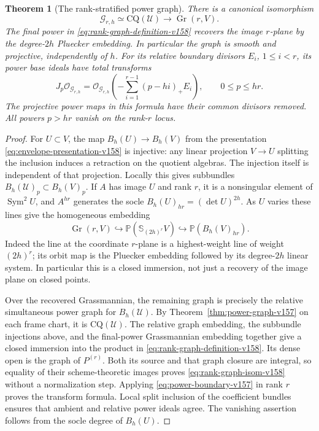 \documentclass[11pt,reqno]{amsart}
\numberwithin{equation}{section}
\newtheorem{theorem}{Theorem}[section]
\theoremstyle{definition}\newtheorem{definition}[theorem]{Definition}
\theoremstyle{remark}\newtheorem{remark}[theorem]{Remark}
\newcommand{\Pj}{\mathbb P}\newcommand{\A}{\mathbb A}
\newcommand{\OO}{\mathcal O}\newcommand{\II}{\mathcal I}
\DeclareMathOperator{\Sym}{Sym}\DeclareMathOperator{\Gr}{Gr}
\begin{document}
\begin{theorem}[The rank-stratified power graph]
\label{thm:all-rank-graph-v158}
There is a canonical isomorphism
\begin{equation}\label{eq:rank-graph-isom-v158}
 \mathcal G_{r,h}\simeq\mathrm{CQ}(\mathcal U)
                  \longrightarrow\Gr(r,V).
\end{equation}
The final power in \eqref{eq:rank-graph-definition-v158} recovers the
image $r$-plane by the degree-$2h$ Pluecker embedding. In particular
the graph is smooth and projective, independently of $h$. For its
relative boundary divisors $E_i$, $1\leq i<r$, its power base ideals
have total transforms
\begin{equation}\label{eq:rank-boundary-v158}
 J_p\OO_{\mathcal G_{r,h}}=
 \OO_{\mathcal G_{r,h}}\left(-\sum_{i=1}^{r-1}(p-hi)_+E_i\right),
 \qquad 0\leq p\leq hr.
\end{equation}
The projective power maps in this formula have their common divisors
removed. All powers $p>hr$ vanish on the rank-$r$ locus.
\end{theorem}
\begin{proof}
For $U\subset V$, the map $B_h(U)\to B_h(V)$ from the presentation
\eqref{eq:envelope-presentation-v158} is injective: any linear projection
$V\to U$ splitting the inclusion induces a retraction on the quotient
algebras. The injection itself is independent of that projection.
Locally this gives subbundles $B_h(\mathcal U)_p\subset B_h(V)_p$.
If $A$ has image $U$ and rank $r$, it is a nonsingular element of
$\Sym^2U$, and $A^{hr}$ generates the socle
$B_h(U)_{hr}=(\det U)^{2h}$. As $U$ varies these lines give the
homogeneous embedding
\[
 \Gr(r,V)\hookrightarrow\Pj(\mathbb S_{(2h)^r}V)
                         \hookrightarrow\Pj(B_h(V)_{hr}).
\]
Indeed the line at the coordinate $r$-plane is a highest-weight line
of weight $(2h)^r$; its orbit map is the Pluecker embedding followed
by its degree-$2h$ linear system. In particular this is a closed
immersion, not just a recovery of the image plane on closed points.

Over the recovered Grassmannian, the remaining graph is precisely the
relative simultaneous power graph for $B_h(\mathcal U)$. By
Theorem~\ref{thm:power-graph-v157} on each frame chart, it is
$\mathrm{CQ}(\mathcal U)$. The relative graph embedding, the subbundle
injections above, and the final-power Grassmannian embedding together
give a closed immersion into the product in
\eqref{eq:rank-graph-definition-v158}. Its dense open is the graph
of $P^{(r)}$. Both its source and that graph closure are integral,
so equality of their scheme-theoretic images proves
\eqref{eq:rank-graph-isom-v158} without a normalization step.
Applying \eqref{eq:power-boundary-v157} in rank $r$ proves the
transform formula. Local split inclusion of the coefficient bundles
ensures that ambient and relative power ideals agree. The vanishing
assertion follows from the socle degree of $B_h(U)$.
\end{proof}
\end{document}
